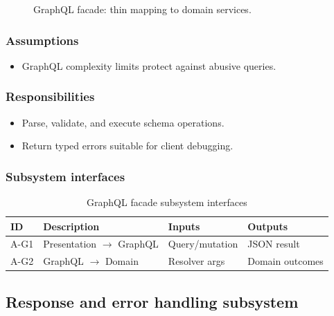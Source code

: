 \begin{figure}[H]
\centering
{}
\caption{GraphQL facade: thin mapping to domain services.}
\label{fig:app-gql}
\end{figure}

\subsubsection{Assumptions}
\begin{itemize}
  \item GraphQL complexity limits protect against abusive queries.
\end{itemize}

\subsubsection{Responsibilities}
\begin{itemize}
  \item Parse, validate, and execute schema operations.
  \item Return typed errors suitable for client debugging.
\end{itemize}

\subsubsection{Subsystem interfaces}
\begin{table}[H]
\centering
\small
\begin{tabular}{|p{0.9cm}|p{3.4cm}|p{3.0cm}|p{3.5cm}|}
\hline
\textbf{ID} & \textbf{Description} & \textbf{Inputs} & \textbf{Outputs} \\
\hline
A-G1 & Presentation $\rightarrow$ GraphQL & Query/mutation & JSON result \\
\hline
A-G2 & GraphQL $\rightarrow$ Domain & Resolver args & Domain outcomes \\
\hline
\end{tabular}
\caption{GraphQL facade subsystem interfaces}
\end{table}

\subsection{Response and error handling subsystem}

